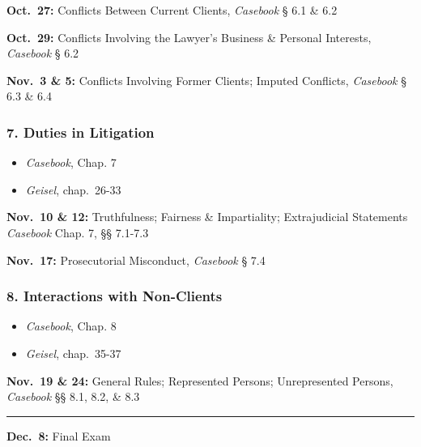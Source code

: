 \documentclass[11pt,letterpaper,twoside]{article}
\providecommand{\tightlist}{%
\setlength{\itemsep}{0em}\setlength{\parskip}{0em}\setlength{\itemindent}{0em}}
\begin{document}
\textbf{Oct.~27:} Conflicts Between Current Clients, \emph{Casebook} §
6.1 \& 6.2

\textbf{Oct.~29:} Conflicts Involving the Lawyer's Business \& Personal
Interests, \emph{Casebook} § 6.2

\textbf{Nov.~3 \& 5:} Conflicts Involving Former Clients; Imputed
Conflicts, \emph{Casebook} § 6.3 \& 6.4

\subsubsection{7. Duties in Litigation}\label{duties-in-litigation}

\begin{itemize}
\tightlist
\item
  \emph{Casebook}, Chap. 7
\item
  \emph{Geisel}, chap.~26-33
\end{itemize}

\textbf{Nov.~10 \& 12:} Truthfulness; Fairness \& Impartiality;
Extrajudicial Statements \emph{Casebook} Chap. 7, §§ 7.1-7.3

\textbf{Nov.~17:} Prosecutorial Misconduct, \emph{Casebook} § 7.4

\subsubsection{8. Interactions with
Non-Clients}\label{interactions-with-non-clients}

\begin{itemize}
\tightlist
\item
  \emph{Casebook}, Chap. 8
\item
  \emph{Geisel}, chap.~35-37
\end{itemize}

\textbf{Nov.~19 \& 24:} General Rules; Represented Persons;
Unrepresented Persons, \emph{Casebook} §§ 8.1, 8.2, \& 8.3

\begin{center}\rule{0.5\linewidth}{0.5pt}\end{center}

\textbf{Dec.~8:} Final Exam
\end{document}
